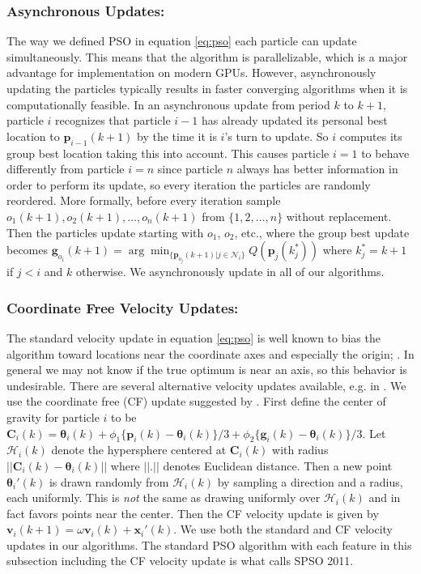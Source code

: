 \documentclass[cmbright]{staauth}
\numberwithin{table}{section}
\begin{document}
\subsubsection{Asynchronous Updates:}
The way we defined PSO in equation \eqref{eq:pso} each particle can update simultaneously. This means that the algorithm is parallelizable, which is a major advantage for implementation on modern GPUs. However, asynchronously updating the particles typically results in faster converging algorithms when it is computationally feasible. In an asynchronous update from period $k$ to $k+1$, particle $i$ recognizes that particle $i-1$ has already updated its personal best location to $\bm{p}_{i-1}(k+1)$ by the time it is $i$'s turn to update. So $i$ computes its group best location taking this into account. This causes particle $i=1$ to behave differently from particle $i=n$ since particle $n$ always has better information in order to perform its update, so every iteration the particles are randomly reordered. More formally, before every iteration sample $o_1(k+1), o_2(k+1), \dots, o_{n}(k+1)$ from $\{1,2,\dots,n\}$ without replacement. Then the particles update starting with $o_1$, $o_2$, etc., where the group best update becomes $\bm{g}_{o_i}(k+1) = \arg\min_{\{\bm{p}_{o_j}(k+1)|j\in\mathcal{N}_i\}}Q(\bm{p}_j(k_j^*))$ where $k^*_j=k+1$ if $j<i$ and $k$ otherwise. We asynchronously update in all of our algorithms.

\subsubsection{Coordinate Free Velocity Updates:}
The standard velocity update in equation \eqref{eq:pso} is well known to bias the algorithm toward locations near the coordinate axes and especially the origin; \cite{monson2005exposing,spears2010biases}. In general we may not know if the true optimum is near an axis, so this behavior is undesirable. There are several alternative velocity updates available, e.g. in \cite{monson2005exposing}. We use the coordinate free (CF) update suggested by \cite{clerc2011spso}. First define the center of gravity for particle $i$ to be $\bm{C}_i(k) = \bm{\theta}_i(k) + \phi_1\{\bm{p}_i(k) - \bm{\theta}_i(k)\}/3 + \phi_2\{\bm{g}_i(k) - \bm{\theta}_i(k)\}/3$. Let $\mathcal{H}_i(k)$ denote the hypersphere centered at $\bm{C}_i(k)$ with radius $||\bm{C}_i(k) - \bm{\theta}_i(k)||$ where $||.||$ denotes Euclidean distance. Then a new point $\bm{\theta}_i'(k)$ is drawn randomly from $\mathcal{H}_i(k)$ by sampling a direction and a radius, each uniformly. This is \emph{not} the same as drawing uniformly over $\mathcal{H}_i(k)$ and in fact favors points near the center. Then the CF velocity update is given by $\bm{v}_i(k+1) = \omega \bm{v}_i(k) + \bm{x}_i'(k)$. We use both the standard and CF velocity updates in our algorithms. The standard PSO algorithm with each feature in this subsection including the CF velocity update is what \cite{clerc2011spso} calls SPSO 2011.
\end{document}
